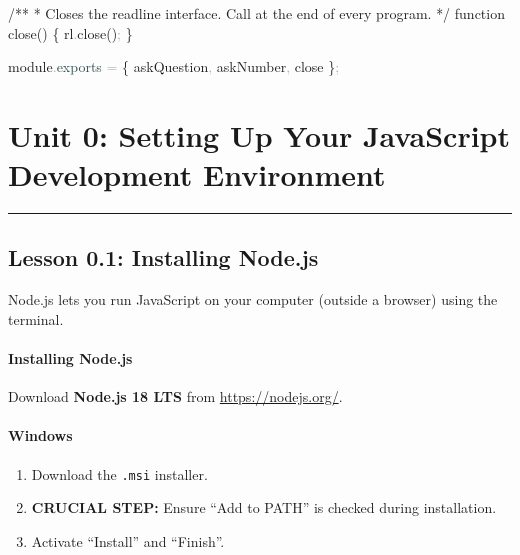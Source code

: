 \documentclass[
  justified,
  openright,
]{tufte-book}
\let\subsubsection\paragraph
\let\paragraph\paragraph
\newcommand{\AttributeTok}[1]{\textcolor{DarkSlateGray}{#1}}
\newcommand{\CommentTok}[1]{\textcolor{MidGray}{#1}}
\newcommand{\FunctionTok}[1]{\textcolor{BrandBlue}{#1}}
\newcommand{\KeywordTok}[1]{\textcolor{BrandBlue}{#1}}
\newcommand{\NormalTok}[1]{#1}
\newcommand{\OperatorTok}[1]{\textcolor{DarkGray}{#1}}
\newenvironment{Shaded}{%
  \begin{snugshade}
}{%
  \end{snugshade}
}
\let\subsubsection\paragraph
\let\paragraph\paragraph
\providecommand{\tightlist}{%
  \setlength{\itemsep}{0pt}\setlength{\parskip}{0pt}}
\begin{document}
\begin{Shaded}
\begin{Highlighting}[]
\CommentTok{/**}
\CommentTok{ * Closes the readline interface. Call at the end of every program.}
\CommentTok{ */}
\KeywordTok{function} \FunctionTok{close}\NormalTok{() \{}
\NormalTok{  rl}\OperatorTok{.}\FunctionTok{close}\NormalTok{()}\OperatorTok{;}
\NormalTok{\}}

\NormalTok{module}\OperatorTok{.}\AttributeTok{exports} \OperatorTok{=}\NormalTok{ \{ askQuestion}\OperatorTok{,}\NormalTok{ askNumber}\OperatorTok{,}\NormalTok{ close \}}\OperatorTok{;}
\end{Highlighting}
\end{Shaded}

\newpage

\section{Unit 0: Setting Up Your JavaScript Development
Environment}\label{unit-0-setting-up-your-javascript-development-environment}

\begin{center}\rule{0.5\linewidth}{0.5pt}\end{center}

\subsection{Lesson 0.1: Installing
Node.js}\label{lesson-0.1-installing-node.js-1}

Node.js lets you run JavaScript on your computer (outside a browser)
using the terminal.

\subsubsection{Installing Node.js}\label{installing-node.js}

Download \textbf{Node.js 18 LTS} from \url{https://nodejs.org/}.

\paragraph{Windows}\label{windows}

\begin{enumerate}
\def\labelenumi{\arabic{enumi}.}
\tightlist
\item
  Download the \texttt{.msi} installer.
\item
  \textbf{CRUCIAL STEP:} Ensure ``Add to PATH'' is checked during
  installation.
\item
  Activate ``Install'' and ``Finish''.
\end{enumerate}
\end{document}
